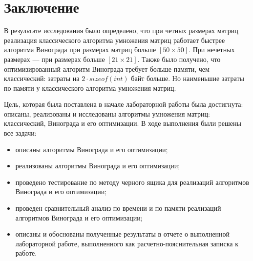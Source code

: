 \chapter*{Заключение}

В результате исследования было определено, что при четных размерах матриц реализация классического алгоритма умножения матриц работает быстрее алгоритма Винограда при размерах матриц больше $[50\times 50]$. При нечетных размерах --- при размерах больше $[21 \times 21]$. 
Также было получено, что оптимизированный алгоритм Винограда требует больше памяти, чем классический: затраты на $2\cdot sizeof(int)$ байт больше. Но наименьшие затраты по памяти у классического алгоритма умножения матриц. 

Цель, которая была поставлена в начале лабораторной работы была достигнута: описаны, реализованы и исследованы алгоритмы умножения матриц: классический, Винограда и его оптимизации. В ходе выполнения были решены все задачи:

\begin{itemize}[label=---]
	\item описаны алгоритмы Винограда и его оптимизации;
	
	\item реализованы алгоритмы Винограда и его оптимизации;
	
	\item проведено тестирование по методу черного ящика для реализаций алгоритмов Винограда и его оптимизации;
	
	\item проведен сравнительный анализ по времени и по памяти реализаций алгоритмов Винограда и его оптимизации;
	
	\item описаны и обоснованы полученные результаты в отчете о выполненной лабораторной работе, выполненного как расчетно-пояснительная записка к работе.
\end{itemize}